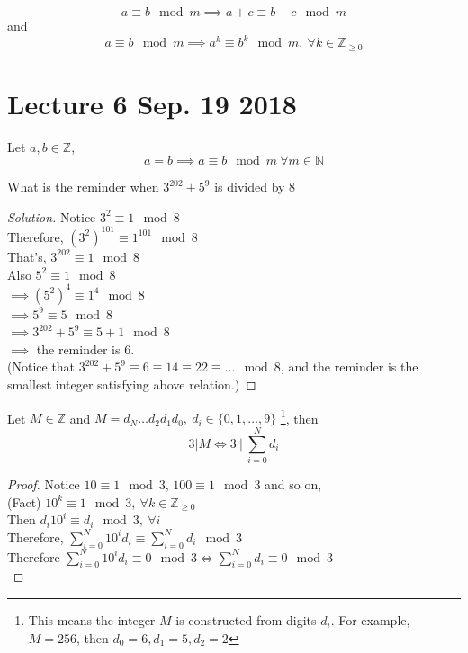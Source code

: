 \documentclass[10pt]{article}
\begin{document}
	\begin{proposition}
		\[
		a \equiv b \mod m \implies a + c \equiv b + c \mod m 
		\] and
		\[
			a \equiv b \mod m \implies a^k \equiv b^k \mod m,\ \forall k \in \mathbb{Z}_{\geq 0}
		\]
	\end{proposition}
	
	\section{Lecture 6 Sep. 19 2018}
	
	\begin{theorem}
		Let $a,b \in \mathbb{Z}$,
		\[
			a = b \implies a \equiv b \mod m\ \forall m \in \mathbb{N}
		\]
	\end{theorem}
	
	\begin{example}
		What is the reminder when $3^{202}+5^9$ is divided by 8		
		\begin{proof}[Solution]
			Notice $3^2 \equiv 1 \mod 8$ \\
			Therefore, $(3^2)^{101} \equiv 1^{101} \mod 8$ \\
			That's, $3^{202} \equiv 1 \mod 8$ \\
			Also $5^2 \equiv 1 \mod 8$ \\
			$\implies (5^2)^4 \equiv 1^4 \mod 8$ \\
			$\implies 5^9 \equiv 5 \mod 8$ \\
			$\implies 3^{202} + 5^9 \equiv 5 + 1 \mod 8$ \\
			$\implies$ the reminder is $6$. \\
			(Notice that $3^{202} + 5^9 \equiv 6 \equiv 14 \equiv 22 \equiv \dots \mod 8 $, and the reminder is the smallest integer satisfying above relation.)
		\end{proof}
	\end{example}
	
	\begin{theorem}
		Let $M \in \mathbb{Z}$ and $M = d_N \dots d_2 d_1 d_0,\ d_i \in \{0,1,\dots,9\}$ \footnote{This means the integer $M$ is constructed from digits $d_i$. For example, $M=256$, then $d_0=6, d_1=5,d_2=2$}, then
		\[
			3 | M \iff 3\ |\ \sum_{i=0}^N{d_i}
		\]
	\end{theorem}
	
	\begin{proof}
		Notice $10 \equiv 1 \mod 3$, $100 \equiv 1 \mod 3$ and so on, \\
		(Fact) $10^k \equiv 1 \mod 3,\ \forall k \in \mathbb{Z}_{\geq 0}$ \\
		Then $d_i 10^i \equiv d_i \mod 3,\ \forall i$ \\
		Therefore, $\sum_{i=0}^N{10^i d_i} \equiv \sum_{i=0}^N{d_i} \mod 3$ \\
		Therefore $\sum_{i=0}^N{10^i d_i} \equiv 0 \mod 3 \iff \sum_{i=0}^N{d_i} \equiv 0 \mod 3$ \\
	\end{proof}
		
\end{document}

